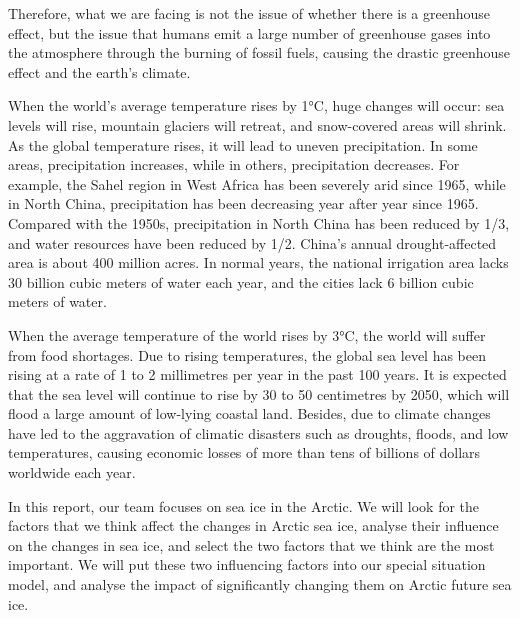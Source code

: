 Therefore, what we are facing is not the issue of whether there is a greenhouse effect, but the issue that humans emit a large number of greenhouse gases into the atmosphere through the burning of fossil fuels, causing the drastic greenhouse effect and the earth’s climate.

When the world's average temperature rises by 1°C, huge changes will occur: sea levels will rise, mountain glaciers will retreat, and snow-covered areas will shrink. As the global temperature rises, it will lead to uneven precipitation. In some areas, precipitation increases, while in others, precipitation decreases. For example, the Sahel region in West Africa has been severely arid since 1965, while in North China, precipitation has been decreasing year after year since 1965. Compared with the 1950s, precipitation in North China has been reduced by 1/3, and water resources have been reduced by 1/2. China's annual drought-affected area is about 400 million acres. In normal years, the national irrigation area lacks 30 billion cubic meters of water each year, and the cities lack 6 billion cubic meters of water. 

When the average temperature of the world rises by 3°C, the world will suffer from food shortages. Due to rising temperatures, the global sea level has been rising at a rate of 1 to 2 millimetres per year in the past 100 years. It is expected that the sea level will continue to rise by 30 to 50 centimetres by 2050, which will flood a large amount of low-lying coastal land. Besides, due to climate changes have led to the aggravation of climatic disasters such as droughts, floods, and low temperatures, causing economic losses of more than tens of billions of dollars worldwide each year.


In this report, our team focuses on sea ice in the Arctic. We will look for the factors that we think affect the changes in Arctic sea ice, analyse their influence on the changes in sea ice, and select the two factors that we think are the most important. We will put these two influencing factors into our special situation model, and analyse the impact of significantly changing them on Arctic future sea ice.